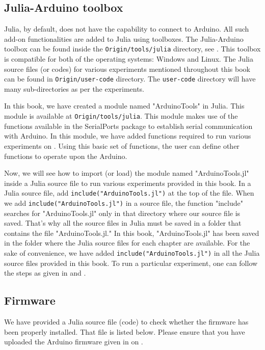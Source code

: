 \subsection{Julia-Arduino toolbox}
\label{sec:julia-toolbox}
Julia, by default, does not have the capability to connect to Arduino. 
All such add-on functionalities are added to Julia using toolboxes. 
The Julia-Arduino toolbox can be found inside the {\tt Origin/tools/julia} directory, 
see .  This toolbox is compatible for both of the operating systems: Windows and Linux. 
The Julia source files (or codes) for various experiments mentioned throughout this book can be found in 
{\tt Origin/user-code} directory. The {\tt user-code} directory will have many sub-directories as per the experiments. 

In this book, we have created a module named "ArduinoTools" in Julia.  This module is available at 
{\tt Origin/tools/julia}. This module makes use of the functions available in the SerialPorts package to 
establish serial communication with Arduino. In this module, we have added functions required to run 
various experiments on \arduino. Using this basic set of functions, the user can define other functions to operate
upon the Arduino. 


Now, we will see how to import (or load) the module named "ArduinoTools.jl" inside a Julia source file to run 
various experiments provided in this book. In a Julia source file, add {\tt include("ArduinoTools.jl")} at the top of the file. 
When we add {\tt include("ArduinoTools.jl")} in a source file, the function "include" searches for "ArduinoTools.jl" 
only in that directory where our source file is saved. That's why all the source files in Julia 
must be saved in a folder that contains the file "ArduinoTools.jl." In this book, "ArduinoTools.jl" has been saved 
in the folder where the Julia source files for each chapter are available. For the sake of convenience, we have 
added {\tt include("ArduinoTools.jl")} in all the Julia source files provided in this book. 
To run a particular experiment, one can follow the steps as given in  and . 

\subsection{Firmware}
\lstset{style=mystyle}
\label{sec:test-firmware-julia}
We have provided a Julia source file (code) to check whether the firmware has been
properly installed.  That file is listed below.  Please ensure that 
you have uploaded the Arduino firmware given in  on \arduino.

